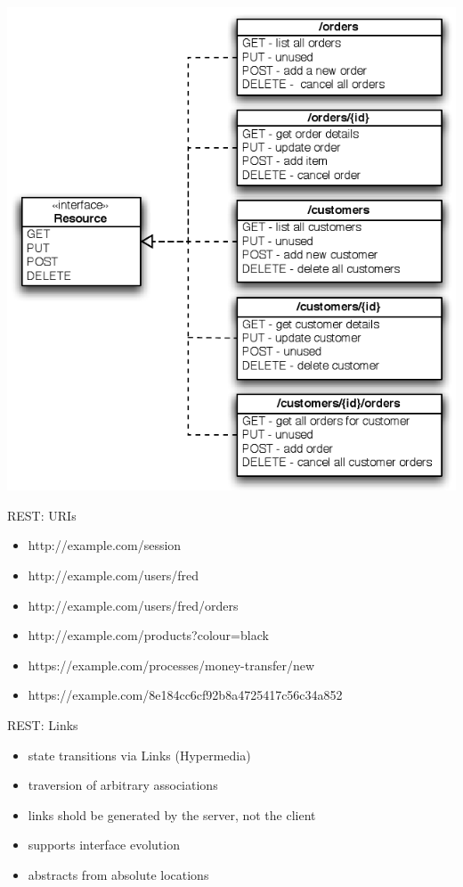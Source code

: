 \documentclass{beamer}
\begin{document}
\begin{frame}
  \includegraphics[height=\textheight]{images/rest_example.png}
\end{frame}

\begin{frame}{REST: URIs}
  \begin{itemize}
    \item http://example.com/session
    \item http://example.com/users/fred
    \item http://example.com/users/fred/orders
    \item http://example.com/products?colour=black
    \item https://example.com/processes/money-transfer/new
    \item https://example.com/8e184cc6cf92b8a4725417c56c34a852
  \end{itemize}
\end{frame}

\begin{frame}{REST: Links}
  \begin{itemize}
    \item state transitions via Links (Hypermedia)
    \item traversion of arbitrary associations
    \item links shold be generated by the server, not the client
    \item supports interface evolution
    \item abstracts from absolute locations
  \end{itemize}
\end{frame}
\end{document}
